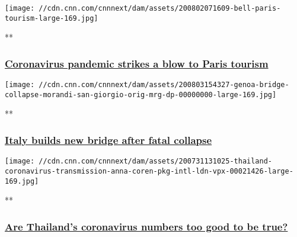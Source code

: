 \href{/videos/travel/2020/08/02/paris-france-tourism-coronavirus-bell-pkg-vpx.cnn/video/playlists/around-the-world/}{}

\texttt{[image: //cdn.cnn.com/cnnnext/dam/assets/200802071609-bell-paris-tourism-large-169.jpg]}

**

\hypertarget{coronavirus-pandemic-strikes-a-blow-to-paris-tourism}{%
\subsubsection{\texorpdfstring{\href{/videos/travel/2020/08/02/paris-france-tourism-coronavirus-bell-pkg-vpx.cnn/video/playlists/around-the-world/}{Coronavirus
pandemic strikes a blow to Paris
tourism}}{Coronavirus pandemic strikes a blow to Paris tourism}}\label{coronavirus-pandemic-strikes-a-blow-to-paris-tourism}}

\href{/videos/world/2020/08/03/genoa-bridge-collapse-morandi-san-giorgio-orig-mrg-dp.cnn/video/playlists/around-the-world/}{}

\texttt{[image: //cdn.cnn.com/cnnnext/dam/assets/200803154327-genoa-bridge-collapse-morandi-san-giorgio-orig-mrg-dp-00000000-large-169.jpg]}

**

\hypertarget{italy-builds-new-bridge-after-fatal-collapse}{%
\subsubsection{\texorpdfstring{\href{/videos/world/2020/08/03/genoa-bridge-collapse-morandi-san-giorgio-orig-mrg-dp.cnn/video/playlists/around-the-world/}{Italy
builds new bridge after fatal
collapse}}{Italy builds new bridge after fatal collapse}}\label{italy-builds-new-bridge-after-fatal-collapse}}

\href{/videos/world/2020/07/31/thailand-coronavirus-transmission-anna-coren-pkg-intl-ldn-vpx.cnn/video/playlists/around-the-world/}{}

\texttt{[image: //cdn.cnn.com/cnnnext/dam/assets/200731131025-thailand-coronavirus-transmission-anna-coren-pkg-intl-ldn-vpx-00021426-large-169.jpg]}

**

\hypertarget{are-thailands-coronavirus-numbers-too-good-to-be-true-}{%
\subsubsection{\texorpdfstring{\href{/videos/world/2020/07/31/thailand-coronavirus-transmission-anna-coren-pkg-intl-ldn-vpx.cnn/video/playlists/around-the-world/}{Are
Thailand's coronavirus numbers too good to be true?
}}{Are Thailand's coronavirus numbers too good to be true? }}\label{are-thailands-coronavirus-numbers-too-good-to-be-true-}}

